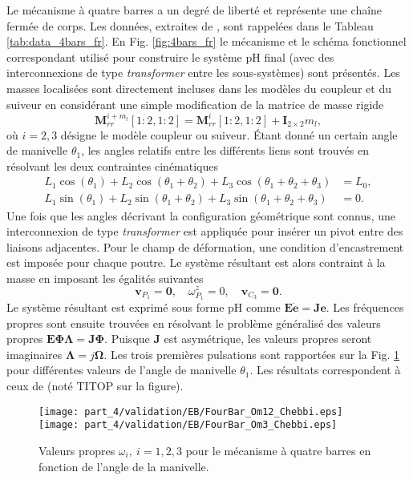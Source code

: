 Le mécanisme à quatre barres a un degré de liberté et représente une chaîne fermée de corps. Les données, extraites de \cite{kitis1990natural,chebbi2017}, sont rappelées dans le Tableau \ref{tab:data_4bars_fr}. En Fig. \ref{fig:4bars_fr} le mécanisme et le schéma fonctionnel correspondant utilisé pour construire le système pH final (avec des interconnexions de type \textit{transformer} entre les sous-systèmes) sont présentés. Les masses localisées sont directement incluses dans les modèles du coupleur et du suiveur en considérant une simple modification de la matrice de masse rigide
\begin{equation*}
\mathbf{M}_{rr}^{i + m_l}[1:2,1:2] = \mathbf{M}_{rr}^{i}[1:2,1:2] + \mathbf{I}_{2\times 2} m_l,
\end{equation*} 
où $i = 2,3$ désigne le modèle coupleur ou suiveur. Étant donné un certain angle de manivelle $\theta_1$, les angles relatifs entre les différents liens sont trouvés en résolvant les deux contraintes cinématiques
\begin{align*}
L_1 \cos(\theta_1)+ L_2 \cos(\theta_1+\theta_2)+ L_3 \cos(\theta_1+\theta_2+\theta_3) &=L_0, \\
L_1 \sin(\theta_1)+L_2 \sin(\theta_1+\theta_2)+L_3 \sin(\theta_1+\theta_2+\theta_3) &=0.
\end{align*} 
Une fois que les angles décrivant la configuration géométrique sont connus, une interconnexion de type \textit{transformer} est appliquée pour insérer un pivot entre des liaisons adjacentes. Pour le champ de déformation, une condition d'encastrement est imposée pour chaque poutre. Le système résultant est alors contraint à la masse en imposant les égalités suivantes
\begin{equation*}
\mathbf{v}_{P_1} = \mathbf{0}, \quad \omega^z_{P_1} = 0, \quad \mathbf{v}_{C_3} = \mathbf{0}.
\end{equation*}
Le système résultant est exprimé sous forme pH comme $\mathbf{E} \dot{\mathbf{e}} = \mathbf{J} \mathbf{e}$. Les fréquences propres sont ensuite trouvées en résolvant le problème généralisé des valeurs propres $\mathbf{E} \bm{\Phi \Lambda} = \mathbf{J} \bm{\Phi} $. Puisque $\mathbf{J} $ est asymétrique, les valeurs propres seront imaginaires $\bm{\Lambda} = j \bm{\Omega} $. Les trois premières pulsations sont rapportées sur la Fig. \ref{fig:omega_4bars_fr} pour différentes valeurs de l'angle de manivelle $\theta_1$. Les résultats correspondent à ceux de \cite{chebbi2017} (noté TITOP sur la figure).

\begin{figure}[tb]
	\centering
	\texttt{[image: part\_4/validation/EB/FourBar\_Om12\_Chebbi.eps]} 
	\texttt{[image: part\_4/validation/EB/FourBar\_Om3\_Chebbi.eps]} 
	\caption{Valeurs propres $\omega_i, \ i = 1,2,3 $ pour le mécanisme à quatre barres en fonction de l'angle de la manivelle.}
	\label{fig:omega_4bars_fr}
\end{figure}


